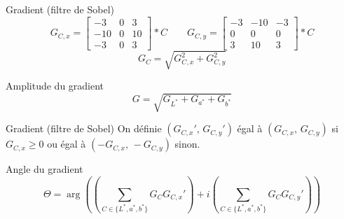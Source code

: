 \documentclass{beamer}
\begin{document}
	\begin{frame}{Gradient (filtre de Sobel)}
		$$ G_{C, x} = \begin{bmatrix} -3 & 0 & 3 \\ -10 & 0 & 10 \\ -3 & 0 & 3 \end{bmatrix} \ast C
		\qquad G_{C, y} = \begin{bmatrix} -3 & -10 & -3 \\ 0 & 0 & 0 \\ 3 & 10 & 3 \end{bmatrix} \ast C
		$$
		$$ G_C = \sqrt{G_{C, x}^2 + G_{C, y}^2} $$
		\begin{block}{Amplitude du gradient}
			\vspace{-2mm}
			$$ G = \sqrt{G_{L^*} + G_{a^*} + G_{b^*}} $$
		\end{block}
	\end{frame}

	\begin{frame}{Gradient (filtre de Sobel)}
		On définie $(G_{C, x}', \, G_{C, y}')$ égal à $(G_{C, x}, \, G_{C, y})$ si $G_{C, x} \geqslant 0$ ou égal à $(-G_{C, x}, \, -G_{C, y})$ sinon. \vspace{3mm}
		
		\begin{block}{Angle du gradient}
			\vspace{-5mm}
			$$ \Theta = \arg \left( \left( \sum_{C \in \{L^*, a^*, b^*\}} G_C G_{C, x}' \right) + i \left( \sum_{C \in \{L^*, a^*, b^*\}} G_C G_{C, y}' \right) \right) $$
		\end{block}
	\end{frame}
\end{document}
